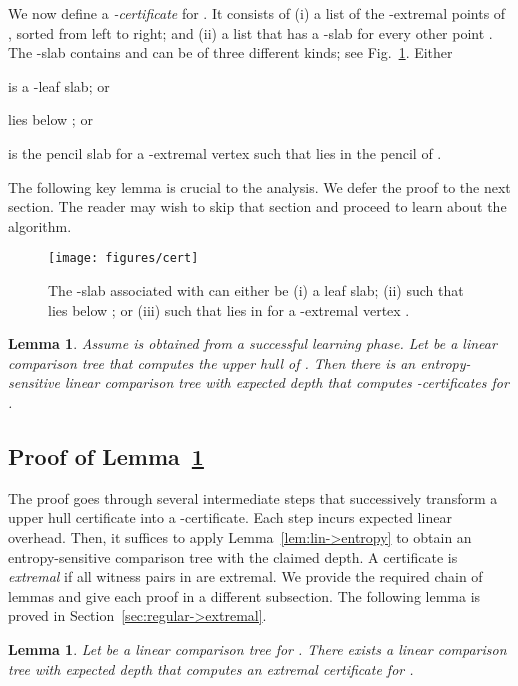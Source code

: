 \documentclass[letterpaper,11pt]{article}
\newtheorem{lemma}[theorem]{Lemma}
\begin{document}
We now define a 
\emph{-certificate} 
for .  It consists of (i) a 
list of the -extremal 
points of , sorted from left 
to right; and (ii) a list that 
has a -slab  for every 
other point . 
The -slab  contains  and 
can be of three different kinds; see
Fig.~\ref{fig:cert}. 
Either
\begin{asparaenum}
  \item  is a -leaf slab; or
  \item  lies below ;
    or
  \item  is the pencil slab for a 
    -extremal vertex  
    such that  lies in the pencil of 
    .
\end{asparaenum}
The following key lemma is crucial to 
the analysis.  We defer the proof to 
the next section. The reader may wish to skip
that section and proceed to learn about 
the algorithm.

\begin{figure}
  \centering
  \texttt{[image: figures/cert]} 
  \caption{The -slab  associated
    with  can either be (i) a leaf slab; (ii) such
    that  lies below ; or (iii)
    such that  lies in 
    for a -extremal vertex .}
\label{fig:cert}
\end{figure}

\begin{lemma}\label{lem:entropy-sensitive-CH}
  Assume  is obtained from a successful 
  learning phase. Let  be 
  a linear comparison tree that computes 
  the upper hull of . Then there is 
  an entropy-sensitive linear comparison tree 
  with expected depth  that computes 
  -certificates for . 
\end{lemma}

\subsection{Proof of Lemma~\ref{lem:entropy-sensitive-CH}}
\label{sec:certificate}

The proof goes through several 
intermediate steps that successively 
transform a upper hull certificate 
into a -certificate. 
Each step incurs expected linear 
overhead. Then, it suffices to 
apply Lemma~\ref{lem:lin->entropy} to obtain an
entropy-sensitive comparison tree with 
the claimed depth.
A certificate  is \emph{extremal} 
if all witness pairs in 
 are extremal. We provide the
required chain 
of lemmas and
give each proof in a different subsection.
The following lemma is proved in 
Section~\ref{sec:regular->extremal}.

\begin{lemma}\label{lem:regular->extremal}
  Let  be a linear comparison tree 
  for . There exists a linear 
  comparison tree with expected depth 
   that computes an 
  extremal certificate for .
\end{lemma}
\end{document}
